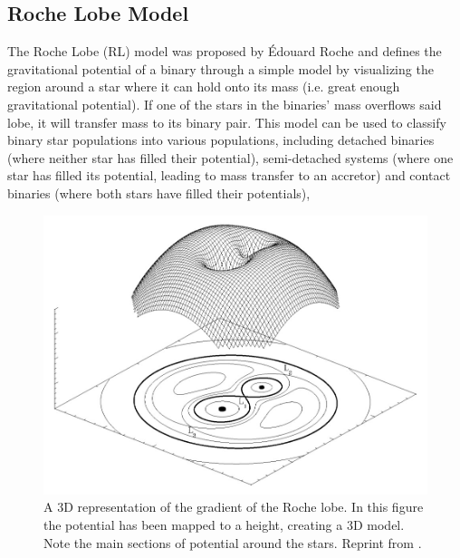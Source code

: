 \documentclass[12pt, a4paper]{article}
\begin{document}
    \subsection{Roche Lobe Model} \label{RLModel} %
        The Roche Lobe (RL) model was proposed by Édouard Roche and defines the gravitational potential of a binary through a simple model by visualizing the region around a star where it can hold onto its mass (i.e. great enough gravitational potential). If one of the stars in the binaries' mass overflows said lobe, it will transfer mass to its binary pair. This model can be used to classify binary star populations into various populations, including detached binaries (where neither star has filled their potential), semi-detached systems (where one star has filled its potential, leading to mass transfer to an accretor) and contact binaries (where both stars have filled their potentials), 

    \vspace*{\fill}
    \begin{figure}[H]
        \centering
        \includegraphics[width=\textwidth]{figs/reused-figs/Wiki-RochePotential.jpg}
        \caption{A 3D representation of the gradient of the Roche lobe. In this figure the potential has been mapped to a height, creating a 3D model. Note the main sections of potential around the stars. Reprint from \parencite{vandersluys2005}.}
        \label{fig:Roche_potential}
    \end{figure}
    \vspace*{\fill}
\end{document}
